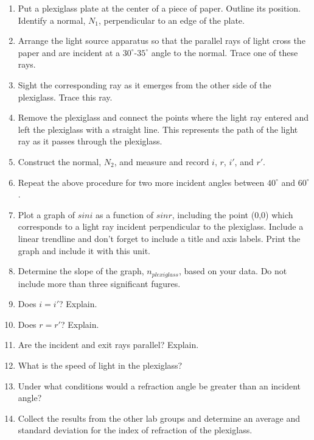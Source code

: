 \begin{enumerate}
\item Put a plexiglass plate at the center of a piece of paper. Outline
its position. Identify a normal, $N_1$, perpendicular to an edge of
the plate.
\item Arrange the light source apparatus so that the parallel rays of light
cross the paper and are incident at a $30^\circ$-$35^\circ$ angle
to the normal. Trace one of these rays.
\item Sight the corresponding ray as it emerges from the other side of the
plexiglass. Trace this ray.
\item Remove the plexiglass and connect the points where the light ray entered 
and left the plexiglass with a straight line. This represents the path of the 
light ray as it passes through the plexiglass.
\item Construct the normal, $N_2$, and measure and record $i$, $r$, $i'$, and 
$r'$.
\vspace{20mm}

\item Repeat the above procedure for two more incident angles between
$40^\circ$ and $60^\circ$.
\vspace{30mm}

\item Plot a graph of $sini$ as a function of $sinr$, including the point (0,0)
 which corresponds to a light ray incident perpendicular to the plexiglass. 
Include a linear trendline and don't forget to include a title and axis labels. 
Print the graph and include it with this unit.

\item Determine the slope of the graph, $n_{plexiglass}$, based on your data. Do 
not include more than three significant fugures.
\vspace{20mm}

\item Does $i = i'$? Explain.
\vspace{20mm}

\item Does $r = r'$? Explain.
\vspace{20mm}

\item Are the incident and exit rays parallel? Explain.
\vspace{20mm}

\item What is the speed of light in the plexiglass?
\vspace{20mm}

\item Under what conditions would a refraction angle be greater than an
incident angle?
\vspace{20mm}

\item Collect the results from the other lab groups and determine an average 
and standard deviation for the index of refraction of the plexiglass.
\end{enumerate}

